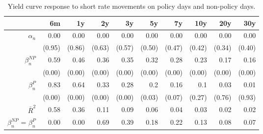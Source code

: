\begin{table}[ht]
\centering
\caption{Yield curve response to short rate movements on policy days and non-policy days.} 
\label{tab:NPvsPdays}
\begingroup\small
\begin{tabular}{rrrrrrrrrr}
  \toprule
  & 6m & 1y & 2y & 3y & 5y & 7y & 10y & 20y & 30y \\ 
  \midrule
$\alpha_n$ & 0.00 & 0.00 & 0.00 & 0.00 & 0.00 & 0.00 & 0.00 & 0.00 & 0.00 \\ 
   & (0.95) & (0.86) & (0.63) & (0.57) & (0.50) & (0.47) & (0.42) & (0.34) & (0.40) \\ 
  $\beta_n^{NP}$ & 0.59 & 0.46 & 0.36 & 0.35 & 0.32 & 0.28 & 0.23 & 0.17 & 0.16 \\ 
   & (0.00) & (0.00) & (0.00) & (0.00) & (0.00) & (0.00) & (0.00) & (0.00) & (0.00) \\ 
  $\beta_n^P$ & 0.83 & 0.64 & 0.33 & 0.28 & 0.2 & 0.16 & 0.1 & 0.03 & 0.01 \\ 
   & (0.00) & (0.00) & (0.00) & (0.00) & (0.03) & (0.07) & (0.27) & (0.76) & (0.93) \\ 
  $\bar{R}^2$ & 0.58 & 0.36 & 0.11 & 0.09 & 0.06 & 0.04 & 0.03 & 0.02 & 0.02 \\ 
  $\beta_n^{NP}$ = $\beta_n^P$ & 0.00 & 0.00 & 0.69 & 0.39 & 0.18 & 0.22 & 0.13 & 0.08 & 0.07 \\ 
   \bottomrule
\end{tabular}
\endgroup
\end{table}
